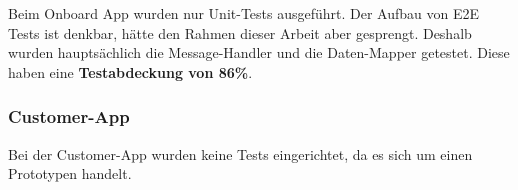 Beim Onboard App wurden nur Unit-Tests ausgeführt. Der Aufbau von E2E Tests ist denkbar, hätte den Rahmen dieser Arbeit aber gesprengt. Deshalb wurden hauptsächlich die Message-Handler und die Daten-Mapper getestet. Diese haben eine \textbf{Testabdeckung von 86\%}.

\subsubsection{Customer-App}

Bei der Customer-App wurden keine Tests eingerichtet, da es sich um einen Prototypen handelt.


